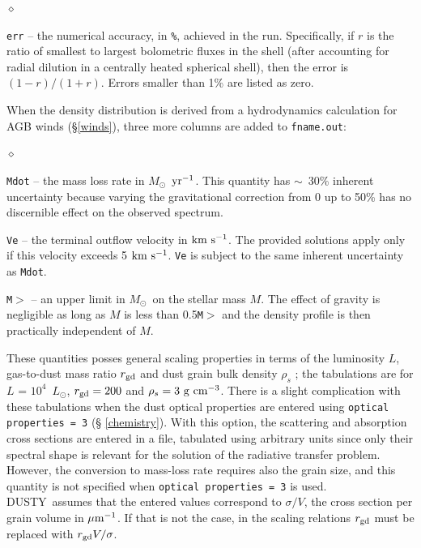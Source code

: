\documentclass[11pt]{article}
\def\D    {{\sf DUSTY}}
\def\E#1{\hbox{$10^{#1}$}}
\def\about  {\hbox{$\sim$}}
\def\mic    {\hbox{$\mu$m}}
\def\Mo     {\hbox{$M_{\odot}$}}
\def\Lo     {\hbox{$L_{\odot}$}}
\def\kms    {\hbox{$\rm km\ s^{-1}$}}
\begin{document}
\begin{list}{$\diamond$}{}
\item {\tt err} -- the numerical accuracy, in {\tt \%}, achieved in
  the run.  Specifically, if $r$ is the ratio of smallest to largest
  bolometric fluxes in the shell (after accounting for radial dilution
  in a centrally heated spherical shell), then the error is $(1 -
  r)/(1 + r)$. Errors smaller than 1\% are listed as zero.

\end{list}
When the density distribution is derived from a hydrodynamics
calculation for AGB winds (\S\ref{winds}), three more columns are
added to {\tt fname.out}:
\begin{list}{$\diamond$}{}
\item {\tt Mdot} -- the mass loss rate in \Mo\ $\rm yr^{-1}$.  This
  quantity has \about\ 30\% inherent uncertainty because varying the
  gravitational correction from 0 up to 50\% has no discernible effect
  on the observed spectrum.

\item {\tt Ve} -- the terminal outflow velocity in \kms. The provided
  solutions apply only if this velocity exceeds 5 \kms.  {\tt Ve} is
  subject to the same inherent uncertainty as {\tt Mdot}.
\item {\tt M$>$} -- an upper limit in \Mo\ on the stellar mass $M$.
  The effect of gravity is negligible as long as $M$ is less than
  0.5{\tt *M$>$} and the density profile is then practically
  independent of $M$.

\end{list}
These quantities posses general scaling properties in terms of the
luminosity $L$, gas-to-dust mass ratio $r_{\rm gd}$ and dust grain
bulk density $\rho_s$ \cite{EI01, IE10}; the tabulations are for $L$ =
\E4\ \Lo, $r_{\rm gd} = 200$ and $\rho_s = 3\ \rm g~cm^{-3}$. There is
a slight complication with these tabulations when the dust optical
properties are entered using {\tt optical properties = 3} (\S
\ref{chemistry}). With this option, the scattering and absorption
cross sections are entered in a file, tabulated using arbitrary units
since only their spectral shape is relevant for the solution of the
radiative transfer problem. However, the conversion to mass-loss rate
requires also the grain size, and this quantity is not specified when
{\tt optical properties = 3} is used.  \D\ assumes that the entered
values correspond to $\sigma/V$, the cross section per grain volume in
$\mic^{-1}$.  If that is not the case, in the scaling relations
$r_{\rm gd}$ must be replaced with $r_{\rm gd}V/\sigma$.
\end{document}
